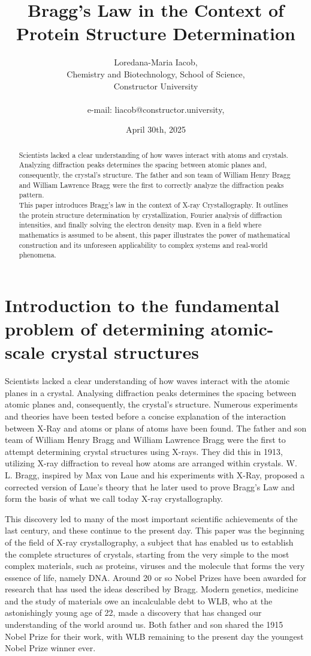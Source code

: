 \documentclass[14pt]{article}
\title{Bragg's Law in the Context of Protein Structure Determination}
\author{%
    \begin{tabular}{c}
        Loredana-Maria Iacob, \\
        Chemistry and Biotechnology, School of Science, \\
        Constructor University \\ 
        \\
        e-mail:  liacob@constructor.university, \\
    \end{tabular}
}
\date{April 30th, 2025} %
\begin{document}
\maketitle

\begin{abstract}
Scientists lacked a clear understanding of how waves interact with atoms and crystals. Analyzing diffraction peaks determines the spacing between atomic planes and, consequently, the crystal's structure. The father and son team of William Henry Bragg and William Lawrence Bragg were the first to correctly analyze the diffraction peaks pattern. \\
This paper introduces Bragg's law in the context of X-ray Crystallography. It outlines the protein structure determination by crystallization, Fourier analysis of diffraction intensities, and finally solving the electron density map. Even in a field where mathematics is assumed to be absent, this paper illustrates the power of mathematical construction and its unforeseen applicability to complex systems and real-world phenomena.
\end{abstract}

\section{Introduction to the fundamental problem of determining atomic-scale crystal structures}

Scientists lacked a clear understanding of how waves interact with the atomic planes in a crystal. Analysing diffraction peaks determines the spacing between atomic planes and, consequently, the crystal's structure. Numerous experiments and theories have been tested before a concise explanation of the interaction between X-Ray and atoms or plans of atoms have been found.
The father and son team of William Henry Bragg and William Lawrence Bragg were the first to attempt determining crystal structures using X-rays. They did this in 1913, utilizing X-ray diffraction to reveal how atoms are arranged within crystals. W. L. Bragg, inspired by Max von Laue and his experiments with X-Ray, proposed a corrected version of Laue's theory that he later used to prove Bragg's Law and form the basis of what we call today X-ray crystallography.

This discovery led to many of the most important scientific achievements of the last century, and these continue to the present day. This paper was the beginning of the field of X-ray crystallography, a subject that has enabled us to establish the complete structures of crystals, starting from the very simple to the most complex materials, such as proteins, viruses and the molecule that forms the very essence of life, namely DNA.
Around 20 or so Nobel Prizes have been awarded for research that has used the ideas described by Bragg. Modern genetics, medicine and the study of materials owe an incalculable debt to WLB, who at the astonishingly young age of 22, made a discovery that has changed our understanding of the world around us. Both father and son shared the 1915 Nobel Prize for their work, with WLB remaining to the present day the youngest Nobel Prize winner ever.
\end{document}
